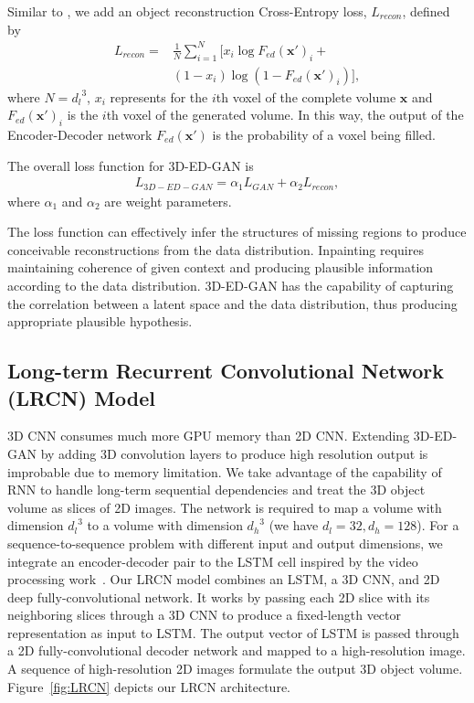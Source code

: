 \documentclass[10pt,twocolumn,letterpaper]{article}
\begin{document}
Similar to \cite{contextencoder}, we add an object reconstruction Cross-Entropy loss, $L_{recon}$, defined by
  \begin{align}
L_{recon}= &\frac{1}{N}\sum_{i=1}^{N} [x_{i} \log F_{ed}(\mathbf{x}')_{i} +\nonumber\\
&(1-x_{i}) \log (1-F_{ed}(\mathbf{x}')_{i})], \label{eq:recon}
  \end{align}
where $N={d_l}^3$, $x_{i}$ represents for the $i$th voxel of the complete volume $\mathbf{x}$ and $F_{ed}(\mathbf{x}')_{i}$ is the $i$th voxel of the generated volume. In this way, the output of the Encoder-Decoder network $F_{ed}(\mathbf{x}')$ is the probability of a voxel being filled.

The overall loss function for 3D-ED-GAN is
  \begin{align}
L_{3D-ED-GAN} = \alpha_1 L_{GAN} + \alpha_2 L_{recon},
  \end{align}
where $\alpha_1$ and $\alpha_2$ are weight parameters.

The loss function can effectively infer the structures of missing regions to produce conceivable reconstructions from the data distribution. Inpainting requires maintaining coherence of given context and producing plausible information according to the data distribution. 3D-ED-GAN has the capability of capturing the correlation between a latent space and the data distribution, thus producing appropriate plausible hypothesis.
\subsection{Long-term Recurrent Convolutional Network (LRCN) Model}
\label{sec:LRCN}

3D CNN consumes much more GPU memory than 2D CNN. Extending 3D-ED-GAN by adding 3D convolution layers to produce high resolution output is improbable due to memory limitation. We take advantage of the capability of RNN to handle long-term sequential dependencies and treat the 3D object volume as slices of 2D images. The network is required to map a volume with dimension ${d_l}^3$ to a volume with dimension ${d_h}^3$ (we have $d_l=32, d_h=128$). For a sequence-to-sequence problem with different input and output dimensions, we integrate an encoder-decoder pair to the LSTM cell inspired by the video processing work~\cite{LRCNvideo}. Our LRCN model combines an LSTM, a 3D CNN, and 2D deep fully-convolutional network. It works by passing each 2D slice with its neighboring slices through a 3D CNN to produce a fixed-length vector representation as input to LSTM. The output vector of LSTM is passed through a 2D fully-convolutional decoder network and mapped to a high-resolution image. A sequence of high-resolution 2D images formulate the output 3D object volume. Figure~\ref{fig:LRCN} depicts our LRCN architecture.%
\end{document}
